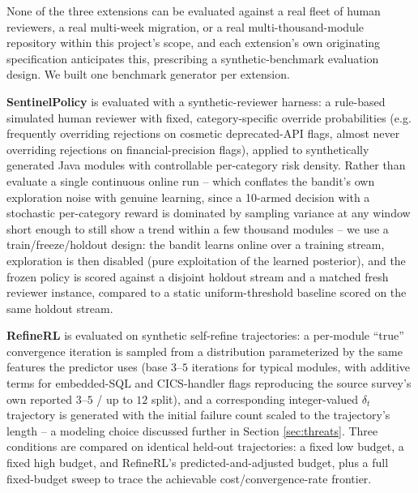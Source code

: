 \documentclass[conference]{IEEEtran}
\begin{document}
None of the three extensions can be evaluated against a real fleet of human
reviewers, a real multi-week migration, or a real multi-thousand-module
repository within this project's scope, and each extension's own originating
specification anticipates this, prescribing a synthetic-benchmark evaluation
design. We built one benchmark generator per extension.

\textbf{SentinelPolicy} is evaluated with a synthetic-reviewer harness: a
rule-based simulated human reviewer with fixed, category-specific override
probabilities (e.g. frequently overriding rejections on cosmetic
deprecated-API flags, almost never overriding rejections on financial-precision
flags), applied to synthetically generated Java modules with controllable
per-category risk density. Rather than evaluate a single continuous online
run -- which conflates the bandit's own exploration noise with genuine
learning, since a 10-armed decision with a stochastic per-category reward is
dominated by sampling variance at any window short enough to still show a
trend within a few thousand modules -- we use a train/freeze/holdout design:
the bandit learns online over a training stream, exploration is then
disabled (pure exploitation of the learned posterior), and the frozen policy
is scored against a disjoint holdout stream and a matched fresh reviewer
instance, compared to a static uniform-threshold baseline scored on the same
holdout stream.

\textbf{RefineRL} is evaluated on synthetic self-refine trajectories: a
per-module ``true'' convergence iteration is sampled from a distribution
parameterized by the same features the predictor uses (base
$3$--$5$ iterations for typical modules, with additive terms for
embedded-SQL and CICS-handler flags reproducing the source survey's own
reported $3$--$5$ / up to $12$ split), and a corresponding integer-valued
$\delta_t$ trajectory is generated with the initial failure count scaled to
the trajectory's length -- a modeling choice discussed further in Section
\ref{sec:threats}. Three conditions are compared on identical held-out
trajectories: a fixed low budget, a fixed high budget, and RefineRL's
predicted-and-adjusted budget, plus a full fixed-budget sweep to trace the
achievable cost/convergence-rate frontier.
\end{document}
